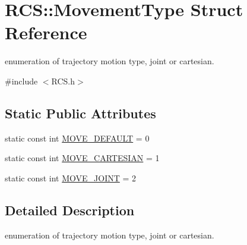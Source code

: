 \hypertarget{structRCS_1_1MovementType}{\section{R\-C\-S\-:\-:Movement\-Type Struct Reference}
\label{structRCS_1_1MovementType}
}


enumeration of trajectory motion type, joint or cartesian.  




{\ttfamily \#include $<$R\-C\-S.\-h$>$}

\subsection*{Static Public Attributes}
\begin{DoxyCompactItemize}
\item 
static const int \hyperlink{structRCS_1_1MovementType_a9e12637043666ace95425072b80ab2d9}{M\-O\-V\-E\-\_\-\-D\-E\-F\-A\-U\-L\-T} = 0
\item 
static const int \hyperlink{structRCS_1_1MovementType_a48f63343f89482694485714786678746}{M\-O\-V\-E\-\_\-\-C\-A\-R\-T\-E\-S\-I\-A\-N} = 1
\item 
static const int \hyperlink{structRCS_1_1MovementType_aed7721f148b578ffd0b9b1bd26a96b3f}{M\-O\-V\-E\-\_\-\-J\-O\-I\-N\-T} = 2
\end{DoxyCompactItemize}


\subsection{Detailed Description}
enumeration of trajectory motion type, joint or cartesian. 

